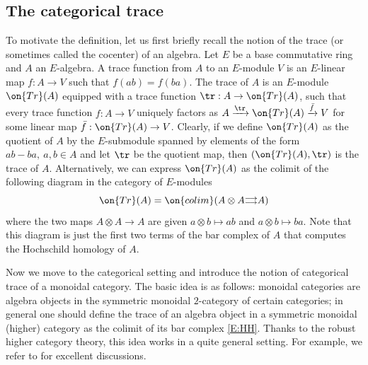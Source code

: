 \documentclass[11pt]{amsart}
\theoremstyle{definition}
\theoremstyle{definition}
\theoremstyle{definition}
\numberwithin{equation}{subsection}
\newcommand{\Tr}{{\on{Tr}}}
\begin{document}
\subsection{The categorical trace}
\label{S: cat trace}
To motivate the definition, let us first briefly recall the notion of the trace (or sometimes called the cocenter) of an algebra.
Let $E$ be a base commutative ring and $A$ an $E$-algebra. A trace function from $A$ to an $E$-module $V$ is an $E$-linear map $f: A\to V$ such that $f(ab)=f(ba)$.
The trace of $A$ is an $E$-module $\Tr(A)$ equipped with a trace function $\tr: A\to \Tr(A)$, such that every trace function $f:A\to V$ uniquely factors as $A\xrightarrow{\tr} \Tr(A)\xrightarrow{\bar{f}}V$ for some linear map $\bar{f}:\Tr(A)\to V$. Clearly, if we define $\Tr(A)$ as the quotient of $A$ by the $E$-submodule spanned by elements of the form $ab-ba,\ a,b\in A$ and let $\tr$ be the quotient map, then $(\Tr(A),\tr)$ is the trace of $A$. Alternatively, we can express $\Tr(A)$ as the colimit of the following diagram in the category of $E$-modules
\begin{equation}
\label{E:HH}
\Tr(A)=\on{colim}(A\otimes A\substack{\longrightarrow\\[-1em] \longrightarrow}  A)
\end{equation}
where the two maps $A\otimes A\to A$ are given $a\otimes b\mapsto ab$ and $a\otimes b\mapsto ba$. Note that this diagram is just the first two terms of the bar complex of $A$ that computes the Hochschild homology of $A$.



Now we move to the categorical setting and introduce the notion of categorical trace of a monoidal category. 
The basic idea is as follows: monoidal categories are algebra objects in the symmetric monoidal $2$-category of certain categories; in general one should define the trace of an algebra object in a symmetric monoidal (higher) category as the colimit of its bar complex \eqref{E:HH}. Thanks to the robust higher category theory, this idea works in a quite general setting.  For example, we refer to \cite{BN} for excellent discussions.
\end{document}
